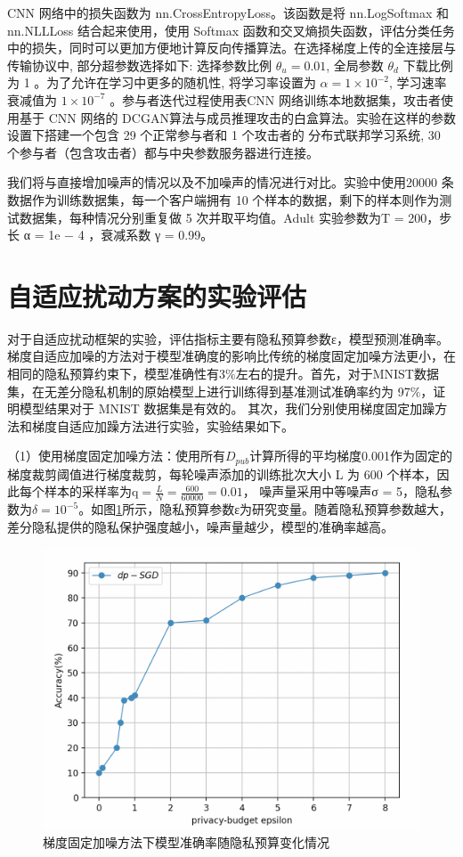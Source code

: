 CNN 网络中的损失函数为 nn.CrossEntropyLoss。该函数是将 nn.LogSoftmax 和nn.NLLLoss 结合起来使用，使用 Softmax 函数和交叉熵损失函数，评估分类任务中的损失，同时可以更加方便地计算反向传播算法。在选择梯度上传的全连接层与传输协议中, 部分超参数选择如下: 选择参数比例 $\theta_{u}=0.01$, 全局参数 $\theta_{d}$ 下载比例为 1 。为了允许在学习中更多的随机性, 将学习率设置为 $\alpha=1 \times 10^{-2}$, 学习速率衰减值为 $1 \times 10^{-7}$ 。参与者迭代过程使用表$\mathrm{CNN}$ 网络训练本地数据集，攻击者使用基于 CNN 网络的 DCGAN算法与成员推理攻击的白盒算法。实验在这样的参数设置下搭建一个包含 29 个正常参与者和 1 个攻击者的 分布式联邦学习系统, 30 个参与者（包含攻击者）都与中央参数服务器进行连接。

我们将与直接增加噪声的情况以及不加噪声的情况进行对比。实验中使用20000 条数据作为训练数据集，每一个客户端拥有 10 个样本的数据，剩下的样本则作为测试数据集，每种情况分别重复做 5 次并取平均值。Adult 实验参数为T = 200，步长 α = 1e − 4 ，衰减系数 γ = 0.99。

\section{自适应扰动方案的实验评估}
对于自适应扰动框架的实验，评估指标主要有隐私预算参数ε，模型预测准确率。梯度自适应加噪的方法对于模型准确度的影响比传统的梯度固定加噪方法更小，在相同的隐私预算约束下，模型准确性有3$\%$左右的提升。首先，对于MNIST数据集，在无差分隐私机制的原始模型上进行训练得到基准测试准确率约为 97$\%$，证明模型结果对于 MNIST 数据集是有效的。 其次，我们分别使用梯度固定加躁方法和梯度自适应加躁方法进行实验，实验结果如下。

（1）使用梯度固定加噪方法：使用所有$D_{p u b}$计算所得的平均梯度0.001作为固定的梯度裁剪阈值进行梯度裁剪，每轮噪声添加的训练批次大小 L 为 600 个样本，因此每个样本的采样率为$\mathrm{q}=\frac{L}{N}=\frac{600}{60000}=0.01$，
噪声量采用中等噪声σ = 5，隐私参数为$\delta=10^{-5}$。如图\ref{fig:梯度固定加噪方法下模型准确率随隐私预算变化情况}所示，隐私预算参数ε为研究变量。随着隐私预算参数越大，差分隐私提供的隐私保护强度越小，噪声量越少，模型的准确率越高。
\begin{figure}[!hbt]
\centering
  	\includegraphics[scale=0.4]{fig2/C5/梯度固定}%
	\caption{梯度固定加噪方法下模型准确率随隐私预算变化情况}
  	\label{fig:梯度固定加噪方法下模型准确率随隐私预算变化情况} 
\end{figure}

